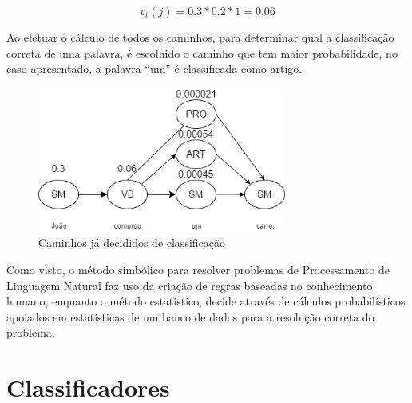 \[ v_t(j) = 0.3 * 0.2 * 1 = 0.06 \] 

Ao efetuar o cálculo de todos os caminhos, para determinar qual a classificação
correta de uma palavra, é escolhido o caminho que tem maior probabilidade, no
caso apresentado, a palavra ``um'' é classificada como artigo.

\newpage

\begin{figure}[htbp]
 \centering
 \includegraphics[height=180px]{imagens/markov2.png}
 \caption{Caminhos já decididos de classificação}
 \label{fig:markov2}
\end{figure}

Como visto, o método simbólico para resolver problemas de Processamento de
Linguagem Natural faz uso da criação de regras baseadas no conhecimento humano,
enquanto o método estatístico, decide através de cálculos probabilísticos
apoiados em estatísticas de um banco de dados para a resolução correta do
problema.


% 
% 
% 

\section{Classificadores}
\label{cap:Classificadores}


